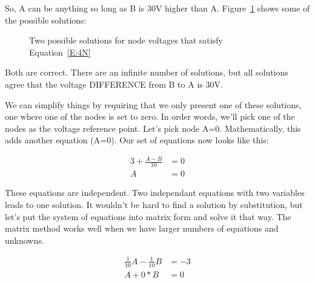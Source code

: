So, A can be anything so long as B is 30V higher than A. Figure~\ref{F:4NS} shows some of the possible solutions:

\begin{figure}[H]
\begin{center}
\caption{Two possible solutions for node voltages that satisfy Equation~\ref{E:4N}}
\label{F:4NS}
\end{center}
\end{figure}

Both are correct. There are an infinite number of solutions, but all solutions agree that the voltage DIFFERENCE from B to A is 30V.
\par
We can simplify things by requiring that we only present one of these solutions, one where one of the nodes is set to zero. In order words, we'll pick one of the nodes as the voltage reference point. Let's pick node A=0. Mathematically, this adds another equation (A=0). Our set of equations now looks like this:

\begin{align}
3 + \frac{A-B}{10}&=0\tag{Node B}\\
A&=0 \tag{Assign reference node}
\end{align} 

These equations are independent. Two independant equations with two variables leads to one solution. It wouldn't be hard to find a solution by substitution, but let's put the system of equations into matrix form and solve it that way. The matrix method works well when we have larger numbers of equations and unknowns.

\begin{align*}
\frac{1}{10}A-\frac{1}{10}B&=-3\\
A+0*B&=0
\end{align*}

